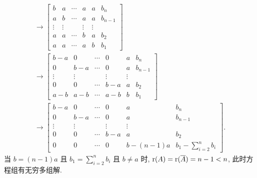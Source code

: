 \begin{enumerate}
\begin{gather*}
            \rightarrow
            \begin{bmatrix}
                b & a & \cdots & a & a & b_n \\
                a & b & \cdots & a & a & b_{n-1} \\
                \vdots & \vdots &  & \vdots & \vdots \\
                a & a & \cdots & b & a & b_2 \\
                a & a & \cdots & a & b & b_1
            \end{bmatrix} \\
            \rightarrow
            \begin{bmatrix}
                b-a & 0 & \cdots & 0 & a & b_n \\
                0 & b-a & \cdots & 0 & a & b_{n-1} \\
                \vdots & \vdots &  & \vdots & \vdots \\
                0 & 0 & \cdots & b-a & a & b_2 \\
                a-b & a-b & \cdots & a-b & b & b_1
            \end{bmatrix} \\
            \rightarrow
            \begin{bmatrix}
                b-a & 0 & \cdots & 0 & a & b_n \\
                0 & b-a & \cdots & 0 & a & b_{n-1} \\
                \vdots & \vdots &  & \vdots & \vdots \\
                0 & 0 & \cdots & b-a & a & b_2 \\
                0 & 0 & \cdots & 0 & b-(n-1)a & b_1 - \sum_{i=2}^nb_i
            \end{bmatrix}.
        \end{gather*}
        当 $b = (n-1)a$ 且 $b_1 = \sum_{i=2}^nb_i$ 且 $b \ne a$ 时, $\mathrm{r}(A) = \mathrm{r}(\overline{A}) = n - 1 < n$, 此时方程组有无穷多组解.
        

\end{enumerate}
